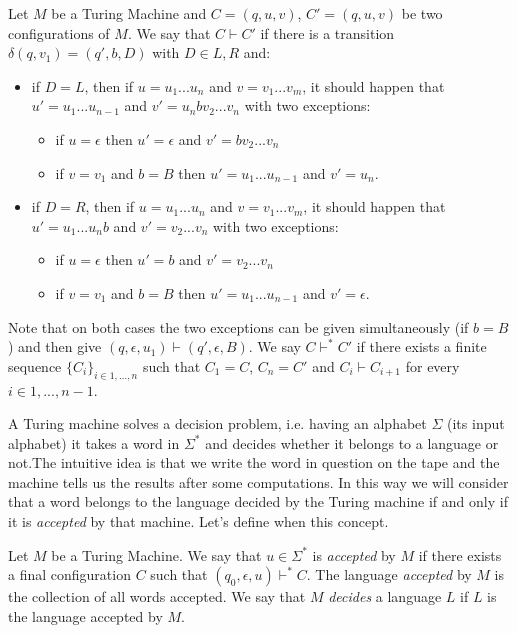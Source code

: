 \begin{definition}
  Let $M$ be a Turing Machine and $C=(q,u,v)$, $C'=(q,u,v)$ be two configurations of $M$. We say that $C\vdash C'$ if there is a transition $\delta (q,v_1) = (q', b, D) $ with $D\in{L,R}$ and:
  \begin{itemize}
  \item if $D=L$, then if $u=u_1...u_n$ and $v = v_1...v_m$, it should happen that $u' = u_1...u_{n-1}$ and $v' = u_n bv_2...v_n$ with two exceptions:
    \begin{itemize}
    \item if $u=\epsilon$ then $u' = \epsilon$ and $v' = bv_2...v_n$
    \item if $v = v_1$ and $b =B$ then $u'=u_1...u_{n-1}$ and $v' = u_n$.
    \end{itemize}

  \item if $D=R$, then if $u=u_1...u_n$ and $v = v_1...v_m$, it should happen that $u' = u_1...u_{n}b$ and $v' = v_2...v_n$ with two exceptions:
    \begin{itemize}
    \item if $u=\epsilon$ then $u' = b$ and $v' =v_2...v_n$
    \item if $v = v_1$ and $b =B$ then $u'=u_1...u_{n-1}$ and $v' = \epsilon$.
    \end{itemize}
  \end{itemize}

  Note that on both cases the two exceptions can be given simultaneously (if $b = B$) and then give $(q, \epsilon, u_1) \vdash (q', \epsilon, B)$. We say $C\vdash^* C'$ if there exists a finite sequence $\{C_i\}_{i\in 1,...,n}$ such that $C_1 = C$, $C_n=C'$ and $C_i\vdash C_{i+1}$ for every $i\in 1,...,n-1$.  
  \end{definition}

  A Turing machine solves a decision problem, i.e. having an alphabet $\Sigma$  (its input alphabet) it takes a word in $\Sigma^*$ and decides whether it belongs to a language or not.The intuitive idea is that we write the word in question on the tape and the machine tells us the results after some computations. In this way we will consider that a word belongs to the language decided by the Turing machine if and only if it is \emph{accepted} by that machine. Let's define when this concept.

  \begin{definition}
     Let $M$ be a Turing Machine. We say that $u\in\Sigma^*$ is \emph{accepted} by $M$ if there exists a final configuration $C$ such that $(q_0,\epsilon,u)\vdash^* C$. The language \emph{accepted} by $M$ is the collection of all words accepted. We say that $M$ \emph{decides} a language $L$ if $L$ is the language accepted by $M$.
  \end{definition}

